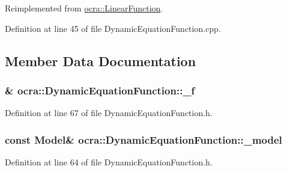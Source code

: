 Reimplemented from \hyperlink{classocra_1_1LinearFunction_a544c87a4f02b4d80ae70e53b80c74461}{ocra\+::\+Linear\+Function}.



Definition at line 45 of file Dynamic\+Equation\+Function.\+cpp.



\subsection{Member Data Documentation}
\subsubsection[{\texorpdfstring{\+\_\+f}{_f}}]{\& ocra\+::\+Dynamic\+Equation\+Function\+::\+\_\+f\hspace{0.3cm}{\ttfamily [protected]}}\hypertarget{classocra_1_1DynamicEquationFunction_a70499af5c86e68836acb7251b37ab668}{}\label{classocra_1_1DynamicEquationFunction_a70499af5c86e68836acb7251b37ab668}


Definition at line 67 of file Dynamic\+Equation\+Function.\+h.

\subsubsection[{\texorpdfstring{\+\_\+model}{_model}}]{\setlength{\rightskip}{0pt plus 5cm}const {\bf Model}\& ocra\+::\+Dynamic\+Equation\+Function\+::\+\_\+model\hspace{0.3cm}{\ttfamily [protected]}}\hypertarget{classocra_1_1DynamicEquationFunction_ad0c5d639974a97aa3ed3f0bbe0f8189d}{}\label{classocra_1_1DynamicEquationFunction_ad0c5d639974a97aa3ed3f0bbe0f8189d}


Definition at line 64 of file Dynamic\+Equation\+Function.\+h.


